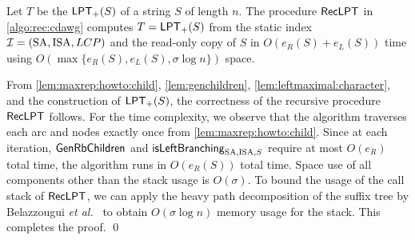 \begin{lemmarep}\label{lem:main:from:lpt:to:cdawg:correct:time}
  Let $T$ be the $\mathsf{LPT}_{+}(S)$ of a string $S$ of length $n$. 
  The procedure $\textsf{RecLPT}$ in \cref{algo:rec:cdawg} computes $T = \mathsf{LPT}_{+}(S)$ from the static index $\mathcal{I} = (\mathrm{SA}, \mathrm{ISA}, LCP)$ and the read-only copy of $S$
  in $O(e_R(S) + e_L(S))$ time using $O(\max\{e_R(S), e_L(S), \sigma\log n\})$ space. 
\end{lemmarep}

\begin{proofsketch}
  From
\cref{lem:maxrep:howto:child},
\cref{lem:genchildren},
\cref{lem:leftmaximal:character},
and the construction of $\mathsf{LPT}_{+}(S)$,
the correctness of the recursive procedure $\textsf{RecLPT}$ follows.
For the time complexity, we observe that the algorithm traverses each arc and nodes exactly once from \cref{lem:maxrep:howto:child}. Since at each iteration, $\textsf{GenRbChildren}_{}$ and $\mbox{\textsf{isLeftBranching}}_{{\mathrm{SA}, \mathrm{ISA}, S}}$ require at most $O(e_R)$ total time, the algorithm runs in $O(e_R(S))$ total time. Space use of all components other than the stack usage is $O(\sigma)$. To bound the usage of the call stack of $\textsf{RecLPT}$, we can apply the heavy path decomposition of the suffix tree by Belazzougui \textit{et al.}~\cite{belazzougui2020linear} to obtain $O(\sigma \log n)$ memory usage for the stack. This completes the proof.
\qed
\end{proofsketch}

